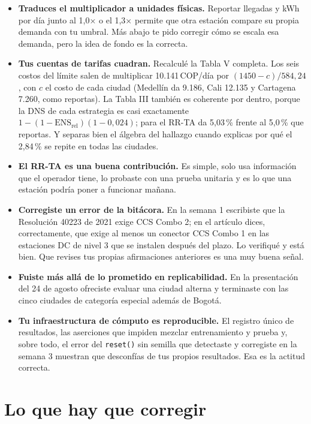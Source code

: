 \documentclass[11pt]{article}
\begin{document}
\begin{itemize}[leftmargin=1.2em,itemsep=5pt]
\item \textbf{Traduces el multiplicador a unidades físicas.} Reportar llegadas y kWh por día junto al 1,0× o el 1,3× permite que otra estación compare su propia demanda con tu umbral. Más abajo te pido corregir cómo se escala esa demanda, pero la idea de fondo es la correcta.

\item \textbf{Tus cuentas de tarifas cuadran.} Recalculé la Tabla V completa. Los seis costos del límite salen de multiplicar 10.141\,COP/día por $(1450-c)/584{,}24$, con $c$ el costo de cada ciudad (Medellín da 9.186, Cali 12.135 y Cartagena 7.260, como reportas). La Tabla III también es coherente por dentro, porque la DNS de cada estrategia es casi exactamente $1-(1-\mathrm{ENS}_{\mathrm{rel}})(1-0{,}024)$; para el RR-TA da 5,03\,\% frente al 5,0\,\% que reportas. Y separas bien el álgebra del hallazgo cuando explicas por qué el 2,84\,\% se repite en todas las ciudades.

\item \textbf{El RR-TA es una buena contribución.} Es simple, solo usa información que el operador tiene, lo probaste con una prueba unitaria y es lo que una estación podría poner a funcionar mañana.

\item \textbf{Corregiste un error de la bitácora.} En la semana 1 escribiste que la Resolución 40223 de 2021 exige CCS Combo 2; en el artículo dices, correctamente, que exige al menos un conector CCS Combo 1 en las estaciones DC de nivel 3 que se instalen después del plazo. Lo verifiqué y está bien. Que revises tus propias afirmaciones anteriores es una muy buena señal.

\item \textbf{Fuiste más allá de lo prometido en replicabilidad.} En la presentación del 24 de agosto ofreciste evaluar una ciudad alterna y terminaste con las cinco ciudades de categoría especial además de Bogotá.

\item \textbf{Tu infraestructura de cómputo es reproducible.} El registro único de resultados, las aserciones que impiden mezclar entrenamiento y prueba y, sobre todo, el error del \texttt{reset()} sin semilla que detectaste y corregiste en la semana 3 muestran que desconfías de tus propios resultados. Esa es la actitud correcta.
\end{itemize}

\section{Lo que hay que corregir}
\end{document}
